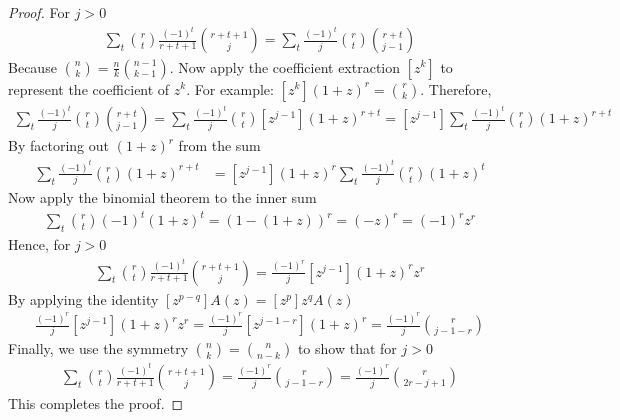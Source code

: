 \begin{lemma}
\begin{proof}
        For $j > 0$
        \begin{align*}
            \sum_t \binom{r}{t} \frac{(-1)^t}{r+t+1} \binom{r+t+1}{j} =  \sum_t \frac{(-1)^t}{j} \binom{r}{t} \binom{r+t}{j-1}
        \end{align*}
        Because $\binom{n}{k} = \frac{n}{k} \binom{n-1}{k-1}$.
        Now apply the coefficient extraction $[z^k]$ to represent the coefficient of $z^k$.
        For example: $[z^k] (1+z)^r = \binom{r}{k}$.
        Therefore,
        \begin{align*}
            \sum_t \frac{(-1)^t}{j}  \binom{r}{t} \binom{r+t}{j-1}
            = \sum_t \frac{(-1)^t}{j} \binom{r}{t} [z^{j-1}] (1+z)^{r+t}
            = [z^{j-1}] \sum_t \frac{(-1)^t}{j} \binom{r}{t} (1+z)^{r+t}
        \end{align*}
        By factoring out $(1+z)^r$ from the sum
        \begin{align*}
            [z^{j-1}] \sum_t \frac{(-1)^t}{j} \binom{r}{t} (1+z)^{r+t}
            &= [z^{j-1}] (1+z)^r \sum_t \frac{(-1)^t}{j} \binom{r}{t} (1+z)^t
        \end{align*}
        Now apply the binomial theorem to the inner sum
        \begin{align*}
            \sum_t \binom{r}{t} (-1)^t (1+z)^t = \left(1 - (1+z)\right)^r = (-z)^r = (-1)^r z^r
        \end{align*}
        Hence, for $j>0$
        \begin{align*}
            \sum_t \binom{r}{t} \frac{(-1)^t}{r+t+1} \binom{r+t+1}{j} = \frac{(-1)^r}{j} [z^{j-1}] (1+z)^r z^r
        \end{align*}
        By applying the identity $[z^{p-q}]A(z)=[z^p]z^qA(z)$
        \begin{align*}
            \frac{(-1)^r}{j}  [z^{j-1}] (1+z)^r z^r = \frac{(-1)^r}{j}  [z^{j-1-r}] (1+z)^r = \frac{(-1)^r}{j} \binom{r}{j - 1 - r}
        \end{align*}
        Finally, we use the symmetry $\binom{n}{k} = \binom{n}{n-k}$ to show that for $j > 0$
        \begin{align*}
            \sum_t \binom{r}{t} \frac{(-1)^t}{r+t+1} \binom{r+t+1}{j} = \frac{(-1)^r}{j} \binom{r}{j - 1 - r} = \frac{(-1)^r}{j} \binom{r}{2r - j + 1}
        \end{align*}
        This completes the proof.
    \end{proof}
\end{lemma}


